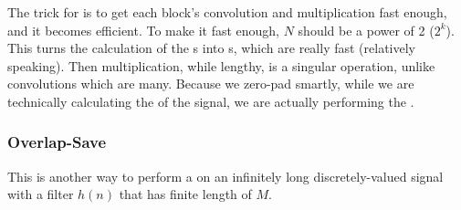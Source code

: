 The trick for  is to get each block's convolution and multiplication fast enough, and it becomes efficient.
To make it fast enough, $N$ should be a power of 2 ($2^{k}$).
This turns the calculation of the s into s, which are really fast (relatively speaking).
Then multiplication, while lengthy, is a singular operation, unlike convolutions which are many.
Because we zero-pad smartly, while we are technically calculating the  of the signal, we are actually performing the .

\subsubsection{Overlap-Save}\label{subsubsec:DFT_Application-Overlap_Save}
This is another way to perform a  on an infinitely long discretely-valued signal with a filter $h(n)$ that has finite length of $M$.

